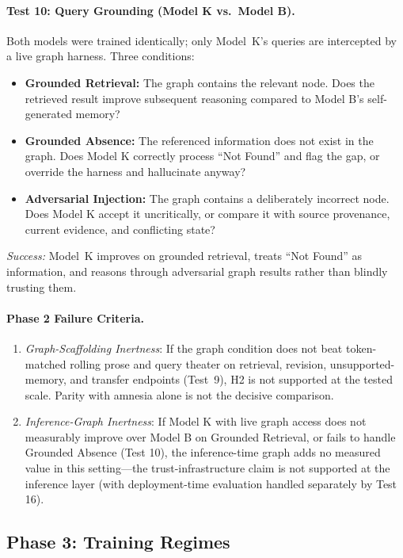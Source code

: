 \paragraph{Test 10: Query Grounding (Model K vs.\ Model B).}
Both models were trained identically; only Model~K's queries are intercepted
by a live graph harness. Three conditions:
\begin{itemize}
    \item \textbf{Grounded Retrieval:} The graph contains the relevant node.
    Does the retrieved result improve subsequent reasoning compared to
    Model B's self-generated memory?
    \item \textbf{Grounded Absence:} The referenced information does not
    exist in the graph. Does Model K correctly process ``Not Found'' and flag
    the gap, or override the harness and hallucinate anyway?
    \item \textbf{Adversarial Injection:} The graph contains a deliberately
    incorrect node. Does Model K accept it uncritically, or compare it with
    source provenance, current evidence, and conflicting state?
\end{itemize}
\emph{Success:} Model~K improves on grounded retrieval, treats ``Not Found'' as
information, and reasons through adversarial graph results rather than blindly
trusting them.

\paragraph{Phase 2 Failure Criteria.}
\begin{enumerate}
    \item \emph{Graph-Scaffolding Inertness}: If the graph condition does not
    beat token-matched rolling prose and query theater on retrieval, revision,
    unsupported-memory, and transfer endpoints (Test~9), H2 is not supported at
    the tested scale. Parity with amnesia alone is not the decisive comparison.
    \item \emph{Inference-Graph Inertness}: If Model K with live graph access does not measurably improve over Model B on Grounded Retrieval, or fails to handle Grounded Absence (Test 10), the inference-time graph adds no measured value in this setting---the trust-infrastructure claim is not supported at the inference layer (with deployment-time evaluation handled separately by Test 16).
\end{enumerate}


\subsection{Phase 3: Training Regimes}

